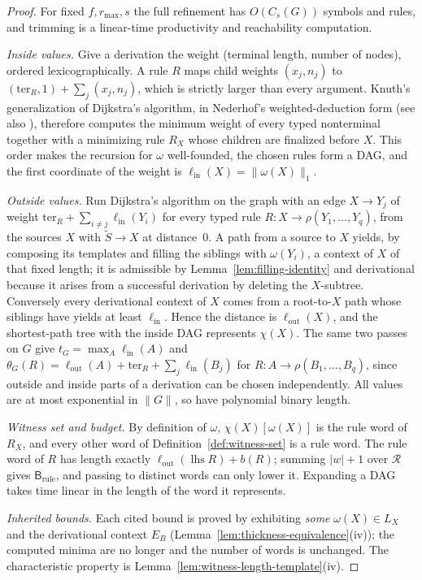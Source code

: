\documentclass[11pt]{article}
\numberwithin{equation}{section}
\theoremstyle{plain}
\theoremstyle{definition}
\theoremstyle{remark}
\theoremstyle{plain}
\begin{document}
\begin{proof}
For fixed $f,r_{\max},s$ the full refinement has $O(C_s(G))$ symbols and rules,
and trimming is a linear-time productivity and reachability computation.

\emph{Inside values.}  Give a derivation the weight (terminal length, number of
nodes), ordered lexicographically.  A rule $R$ maps child weights $(x_j,n_j)$ to
$(\mathrm{ter}_R,1)+\sum_j(x_j,n_j)$, which is strictly larger than every argument.  Knuth's
generalization of Dijkstra's algorithm, in Nederhof's weighted-deduction form
\cite{Nederhof2003} (see also \cite{RamalingamReps1996}), therefore computes the
minimum weight of every typed nonterminal together with a minimizing rule $R_X$
whose children are finalized before $X$.  This order makes the recursion for
$\omega$ well-founded, the chosen rules form a DAG, and the first coordinate of
the weight is $\ell_{\mathrm{in}}(X)=\|\omega(X)\|_1$.

\emph{Outside values.}  Run Dijkstra's algorithm on the graph with an edge
$X\to Y_j$ of weight $\mathrm{ter}_R+\sum_{i\ne j}\ell_{\mathrm{in}}(Y_i)$ for every typed rule
$R:X\to\rho(Y_1,\ldots,Y_q)$, from the sources $X$ with $\widetilde S\to X$ at
distance~$0$.  A path from a source to $X$ yields, by composing its templates and
filling the siblings with $\omega(Y_i)$, a context of $X$ of that fixed length; it is
admissible by Lemma~\ref{lem:filling-identity} and derivational because it arises
from a successful derivation by deleting the $X$-subtree.  Conversely every
derivational context of $X$ comes from a root-to-$X$ path whose siblings have
yields at least $\ell_{\mathrm{in}}$.  Hence the distance is $\ell_{\mathrm{out}}(X)$,
and the shortest-path tree with the inside DAG represents $\chi(X)$.  The same two
passes on $G$ give $t_G=\max_A\ell_{\mathrm{in}}(A)$ and
$\theta_G(R)=\ell_{\mathrm{out}}(A)+\mathrm{ter}_R+\sum_j\ell_{\mathrm{in}}(B_j)$ for
$R:A\to\rho(B_1,\ldots,B_q)$, since outside and inside parts of a derivation can be
chosen independently.  All values are at most exponential in $\|G\|$, so have
polynomial binary length.

\emph{Witness set and budget.}  By definition of $\omega$, $\chi(X)[\omega(X)]$ is the
rule word of $R_X$, and every other word of Definition~\ref{def:witness-set} is a
rule word.  The rule word of $R$ has length exactly
$\ell_{\mathrm{out}}(\operatorname{lhs}R)+b(R)$; summing $|w|+1$ over $\mathcal R$
gives $\mathsf B_{\mathrm{rule}}$, and passing to distinct words can only lower it.
Expanding a DAG takes time linear in the length of the word it represents.

\emph{Inherited bounds.}  Each cited bound is proved by exhibiting \emph{some}
$\omega(X)\in L_X$ and the derivational context $E_B$
(Lemma~\ref{lem:thickness-equivalence}(iv)); the computed minima are no longer and
the number of words is unchanged.  The characteristic property is
Lemma~\ref{lem:witness-length-template}(iv).
\end{proof}
\end{document}
